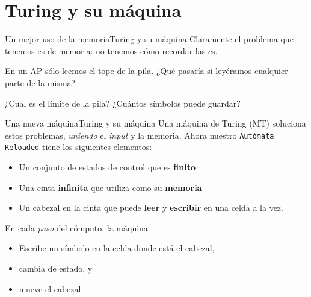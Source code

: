 \documentclass[spanish]{beamer}
\begin{document}
\section{Turing y su máquina}

\begin{frame}{Un mejor uso de la memoria}{Turing y su máquina}
    Claramente el problema que tenemos es de memoria: no tenemos cómo recordar las $c$s. \pause

    \bigskip

    En un AP sólo leemos el tope de la pila. ¿Qué pasaría si leyéramos cualquier parte de la misma? \pause

    \bigskip

    ¿Cuál es el límite de la pila? ¿Cuántos símbolos puede guardar?
\end{frame}

\begin{frame}{Una nueva máquina}{Turing y su máquina}
     Una \alert{máquina de Turing} (MT) soluciona estos problemas, \textit{uniendo} el \textit{input} y la memoria. Ahora nuestro \texttt{Autómata Reloaded} tiene los siguientes elementos: \pause

     \begin{itemize}
        \itemsep1.5ex
        \item Un \alert{conjunto de estados de control} que es \textbf{finito} \pause
        \item Una \alert{cinta} \textbf{infinita} que utiliza como su \textbf{memoria} \pause
        \item Un \alert{cabezal en la cinta} que puede \textbf{leer} y \textbf{escribir} en una celda a la vez. \pause
     \end{itemize}

     En cada \textit{paso} del cómputo, la máquina \pause
     \begin{itemize}
         \itemsep1.5ex
         \item Escribe un símbolo en la celda donde está el cabezal, \pause
         \item cambia de estado, y \pause
         \item mueve el cabezal.
     \end{itemize}
\end{frame}
\end{document}
